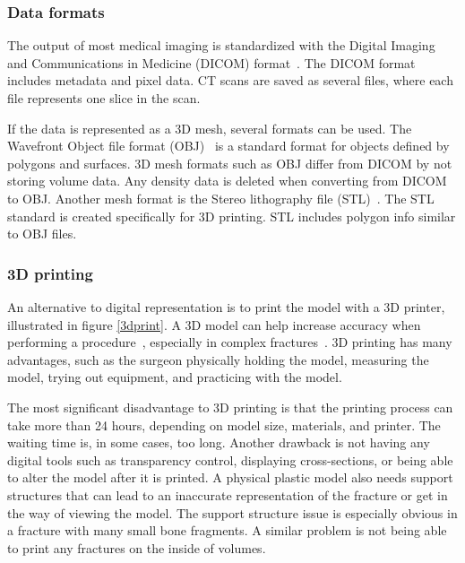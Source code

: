 \documentclass[a4paper]{report}
\begin{document}
\subsubsection{Data formats}

The output of most medical imaging is standardized with the Digital Imaging and Communications in Medicine (DICOM) format~\cite{noauthor_dicom_nodate}. The DICOM format includes metadata and pixel data. CT scans are saved as several files, where each file represents one slice in the scan.

If the data is represented as a 3D mesh, several formats can be used. The Wavefront Object file format (OBJ)~\cite{obj_wavefront_nodate} is a standard format for objects defined by polygons and surfaces. 3D mesh formats such as OBJ differ from DICOM by not storing volume data. Any density data is deleted when converting from DICOM to OBJ.
Another mesh format is the Stereo lithography file (STL)~\cite{noauthor_stl_2019}. The STL standard is created specifically for 3D printing. STL includes polygon info similar to OBJ files.

\subsubsection{ 3D printing }

An alternative to digital representation is to print the model with a 3D printer, illustrated in figure \ref{3dprint}. A 3D model can help increase accuracy when performing a procedure~\cite{shahrubudin_overview_2019}, especially in complex fractures~\cite{chen_efficacy_2019}. 
3D printing has many advantages, such as the surgeon physically holding the model, measuring the model, trying out equipment, and practicing with the model.

The most significant disadvantage to 3D printing is that the printing process can take more than 24 hours, depending on model size, materials, and printer. The waiting time is, in some cases, too long. 
Another drawback is not having any digital tools such as transparency control, displaying cross-sections, or being able to alter the model after it is printed. 
A physical plastic model also needs support structures that can lead to an inaccurate representation of the fracture or get in the way of viewing the model. The support structure issue is especially obvious in a fracture with many small bone fragments. A similar problem is not being able to print any fractures on the inside of volumes.
\end{document}
